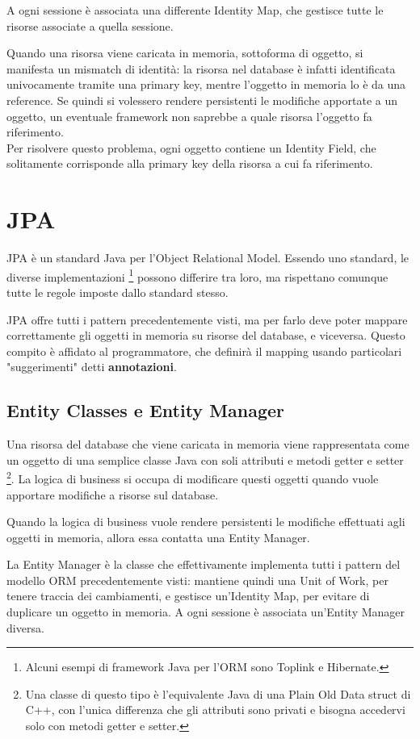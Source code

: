A ogni sessione è associata una differente Identity Map, che gestisce tutte le risorse associate a quella sessione.

Quando una risorsa viene caricata in memoria, sottoforma di oggetto, si manifesta un mismatch di identità: la risorsa nel database è infatti identificata univocamente tramite una primary key, mentre l'oggetto in memoria lo è da una reference.
Se quindi si volessero rendere persistenti le modifiche apportate a un oggetto, un eventuale framework non saprebbe a quale risorsa l'oggetto fa riferimento.\\
Per risolvere questo problema, ogni oggetto contiene un Identity Field, che solitamente corrisponde alla primary key della risorsa a cui fa riferimento.

\section{JPA}
JPA è un standard Java per l'Object Relational Model. Essendo uno standard, le diverse implementazioni \footnote{Alcuni esempi di framework Java per l'ORM sono Toplink e Hibernate.} possono differire tra loro, ma rispettano comunque tutte le regole imposte dallo standard stesso.

JPA offre tutti i pattern precedentemente visti, ma per farlo deve poter mappare correttamente gli oggetti in memoria su risorse del database, e viceversa. Questo compito è affidato al programmatore, che definirà il mapping usando particolari "suggerimenti" detti \textbf{annotazioni}.

\subsection*{Entity Classes e Entity Manager}
Una risorsa del database che viene caricata in memoria  viene rappresentata come un oggetto di una semplice classe Java con soli attributi e metodi getter e setter \footnote{Una classe di questo tipo è l'equivalente Java di una Plain Old Data struct di C++, con l'unica differenza che gli attributi sono privati e bisogna accedervi solo con metodi getter e setter.}. 
La logica di business si occupa di modificare questi oggetti quando vuole apportare modifiche a risorse sul database.

Quando la logica di business vuole rendere persistenti le modifiche effettuati agli oggetti in memoria, allora essa contatta una Entity Manager.

La Entity Manager è la classe che effettivamente implementa tutti i pattern del modello ORM precedentemente visti: mantiene quindi una Unit of Work, per tenere traccia dei cambiamenti, e gestisce un'Identity Map, per evitare di duplicare un oggetto in memoria.
A ogni sessione è associata un'Entity Manager diversa.

